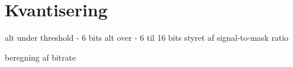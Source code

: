 \section{Kvantisering}


alt under threshold - 6 bits
alt over - 6 til 16 bits styret af signal-to-mask ratio

beregning af bitrate
